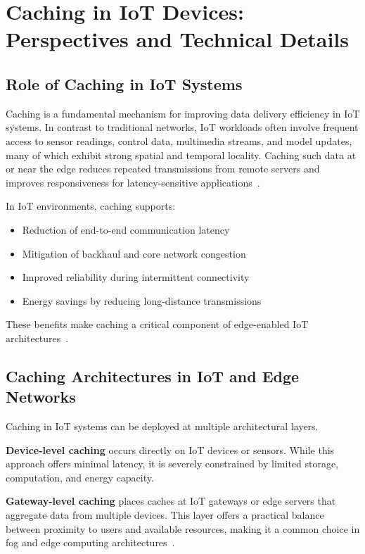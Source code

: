 \section{Caching in IoT Devices: Perspectives and Technical Details}

\subsection{Role of Caching in IoT Systems}

Caching is a fundamental mechanism for improving data delivery efficiency in IoT systems. In contrast to traditional networks, IoT workloads often involve frequent access to sensor readings, control data, multimedia streams, and model updates, many of which exhibit strong spatial and temporal locality. Caching such data at or near the edge reduces repeated transmissions from remote servers and improves responsiveness for latency-sensitive applications~\cite{Satyanarayanan2017Edge,Chiang2016Fog}.

In IoT environments, caching supports:
\begin{itemize}
    \item Reduction of end-to-end communication latency
    \item Mitigation of backhaul and core network congestion
    \item Improved reliability during intermittent connectivity
    \item Energy savings by reducing long-distance transmissions
\end{itemize}

These benefits make caching a critical component of edge-enabled IoT architectures~\cite{Satyanarayanan2017Edge}.

\subsection{Caching Architectures in IoT and Edge Networks}

Caching in IoT systems can be deployed at multiple architectural layers.

\textbf{Device-level caching} occurs directly on IoT devices or sensors. While this approach offers minimal latency, it is severely constrained by limited storage, computation, and energy capacity.

\textbf{Gateway-level caching} places caches at IoT gateways or edge servers that aggregate data from multiple devices. This layer offers a practical balance between proximity to users and available resources, making it a common choice in fog and edge computing architectures~\cite{Chiang2016Fog}.

